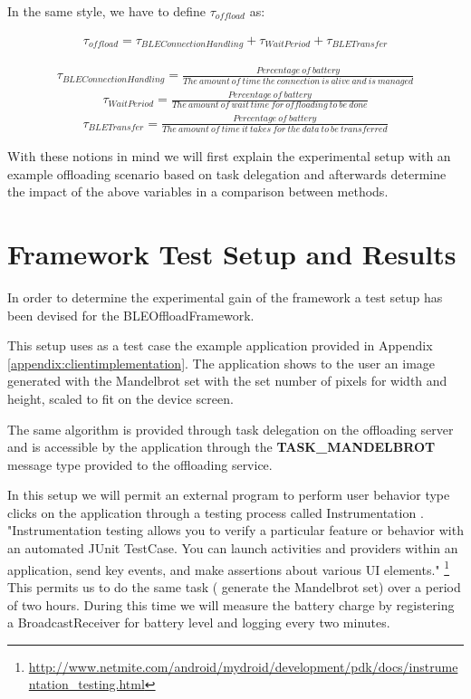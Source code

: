 In the same style, we have to define \(\tau_{offload}\) as:

\begin{align*}
\tau_{offload} = \tau_{BLEConnectionHandling} + \tau_{WaitPeriod} + \tau_{BLETransfer}
\end{align*}

\begin{align*}
\tau_{BLEConnectionHandling} = \tfrac{Percentage\ of\ battery}{The\ amount\ of\ time\ the\ connection\ is\ alive\ and\ is\ managed} 
\end{align*}
\begin{align*}
\tau_{WaitPeriod} = \tfrac{Percentage\ of\ battery}{The\ amount\ of\ wait\ time\ for\ offloading\ to\ be\ done} 
\end{align*}
\begin{align*}
\tau_{BLETransfer} = \tfrac{Percentage\ of\ battery}{The\ amount\ of\ time\ it\ takes\ for\ the\ data\ to\ be\ transferred}
\end{align*}

With these notions in mind we will first explain the experimental setup with an example offloading scenario based on task delegation and afterwards determine the impact of the above variables in a comparison between methods.

\section{Framework Test Setup and Results}

In order to determine the experimental gain of the framework a test setup has been devised for the BLEOffloadFramework. 

This setup uses as a test case the example application provided in Appendix \ref{appendix:clientimplementation}. The application shows to the user an image generated with the Mandelbrot set \cite{mandelbrot2013fractals} with the set number of pixels for width and height, scaled to fit on the device screen.

The same algorithm is provided through task delegation on the offloading server and is accessible by the application through the \textbf{TASK_MANDELBROT} message type provided to the offloading service.

In this setup we will permit an external program to perform user behavior type clicks on the application through a testing process called Instrumentation \cite{kropp2010automated}. "Instrumentation testing allows you to verify a particular feature or behavior with an automated JUnit TestCase. You can launch activities and providers within an application, send key events, and make assertions about various UI elements." \footnote{\url{http://www.netmite.com/android/mydroid/development/pdk/docs/instrumentation_testing.html}} This permits us to do the same task ( generate the Mandelbrot set) over a period of two hours. During this time we will measure the battery charge by registering a BroadcastReceiver for battery level and logging every two minutes.

